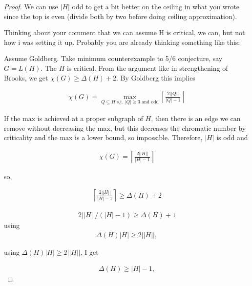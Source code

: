\documentclass[12pt]{amsart}
\theoremstyle{plain}
\theoremstyle{definition}
\theoremstyle{remark}
\newcommand{\ceil}[1]{\left\lceil#1\right\rceil}
\begin{document}
\begin{proof}
We can use $|H|$ odd to get a bit better on the ceiling in what you wrote since the top is even (divide both by two before doing ceiling approximation).

Thinking about your comment that we can assume H is critical, we can,  but not how i was setting it up.   Probably you are already thinking something like this:

Assume Goldberg.   Take minimum counterexample to 5/6 conjecture, say 
$G = L(H)$.   The $H$ is critical.  From the argument like in strengthening of
Brooks,  we get $\chi(G) \ge \Delta(H) + 2$.  By Goldberg this implies

\begin{align*}
\chi(G) = \max_{Q \subseteq H \mbox{ s.t.~$|Q|\ge 3$ and odd
}}\ceil{\frac{2||Q||}{|Q| - 1}}
\end{align*}

If the max is achieved at a proper subgraph of $H$, then there is an edge we
can remove without decreasing the max, but this decreases the chromatic number
by criticality and the max is a lower bound, so impossible. Therefore, $|H|$ is odd and

\begin{align*}
\chi(G)  =  \ceil{\frac{2||H||}{|H| - 1}}
\end{align*}

so,

\begin{align*}
\ceil{\frac{2||H||}{|H| - 1}} \ge \Delta(H) + 2
\end{align*}

\begin{align*}
2||H|| / (|H| - 1) \ge \Delta(H) + 1
\end{align*}
using 
\begin{align*}
\Delta(H)|H| \ge 2||H||,
\end{align*}

using $\Delta(H)|H| \ge 2||H||$, I get

\begin{align*}
\Delta(H) \ge |H| - 1,
\end{align*}
\end{proof}

%
%
%
\end{document}
